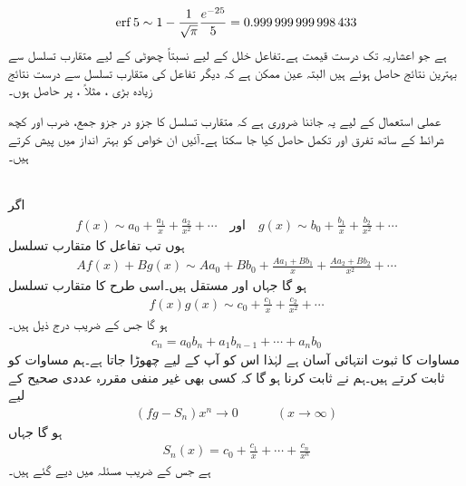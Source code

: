 \begin{align*}
\operatorname{erf} 5\sim 1-\frac{1}{\sqrt{\pi}}\frac{e^{-25}}{5}=\num{0.999999999998433}
\end{align*}
ہے جو  اعشاریہ تک درست قیمت ہے۔تفاعل خلل کے لیے نسبتاً چھوٹی  کے لیے متقارب تسلسل سے  بہترین نتائج حاصل ہوئے ہیں البتہ عین ممکن ہے کہ دیگر تفاعل کی متقارب تسلسل سے درست نتائج  زیادہ بڑی ، مثلاً ، پر حاصل ہوں۔

عملی استعمال کے لیے یہ جاننا ضروری ہے کہ متقارب تسلسل کا جزو در جزو جمع، ضرب اور کچھ شرائط کے ساتھ تفرق اور تکمل حاصل کیا جا سکتا ہے۔آئیں ان خواص کو بہتر انداز میں پیش کرتے ہیں۔

\quad {}\\
اگر 
\begin{align*}
f(x)\sim a_0+\frac{a_1}{x}+\frac{a_2}{x^2}+\cdots\quad \text{اور}\quad g(x)\sim b_0+\frac{b_1}{x}+\frac{b_2}{x^2}+\cdots
\end{align*}
ہوں تب تفاعل  کا متقارب تسلسل
\begin{align}\label{مساوات_اعدادی_مجموعہ_متقارب_الف}
Af(x)+Bg(x)\sim Aa_0+Bb_0+\frac{Aa_1+Bb_1}{x}+\frac{Aa_2+Bb_2}{x^2}+\cdots
\end{align}
ہو گا جہاں  اور  مستقل ہیں۔اسی طرح  کا متقارب تسلسل
\begin{align}\label{مساوات_اعدادی_مجموعہ_متقارب_ب}
f(x)g(x)\sim c_0+\frac{c_1}{x}+\frac{c_2}{x^2}+\cdots
\end{align}
ہو گا جس کے  ضریب  درج ذیل ہیں۔
\begin{align*}
c_n=a_0b_n+a_1b_{n-1}+\cdots+a_nb_0
\end{align*}
\quad
مساوات  کا ثبوت انتہائی آسان ہے لہٰذا اس کو آپ کے لیے چھوڑا جاتا ہے۔ہم مساوات  کو ثابت کرتے ہیں۔ہم نے ثابت کرنا ہو گا کہ کسی بھی غیر منفی مقررہ عددی صحیح  کے لیے
\begin{align}\label{مساوات_اعدادی_مجموعہ_متقارب_پ}
(fg-S_n)x^n\to 0 \quad \quad \quad (x\to\infty)
\end{align}
ہو گا جہاں
\begin{align*}
S_n(x)=c_0+\frac{c_1}{x}+\cdots+\frac{c_n}{x^n}
\end{align*}
ہے جس کے  ضریب   مسئلہ میں دیے گئے ہیں۔

